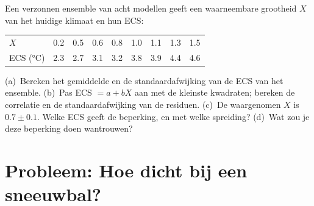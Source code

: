 \begin{exercise}[$\star\star\star$]\label{exo:b3:climate-models:12}
Een verzonnen ensemble van acht modellen geeft een waarneembare grootheid $X$ van het
huidige klimaat en hun ECS:
\begin{center}
\begin{tabular}{l*{8}{c}}
\hline
$X$ & 0.2 & 0.5 & 0.6 & 0.8 & 1.0 & 1.1 & 1.3 & 1.5\\
ECS (\unit{\celsius}) & 2.3 & 2.7 & 3.1 & 3.2 & 3.8 & 3.9 & 4.4 & 4.6\\
\hline
\end{tabular}
\end{center}
(a)~Bereken het gemiddelde en de standaardafwijking van de ECS van het
ensemble. (b)~Pas ECS $= a + bX$ aan met de kleinste kwadraten; bereken de correlatie
en de standaardafwijking van de residuen. (c)~De waargenomen $X$ is $0.7
\pm 0.1$. Welke ECS geeft de beperking, en met welke spreiding?
(d)~Wat zou je deze beperking doen wantrouwen?
\end{exercise}

\section{Probleem: Hoe dicht bij een sneeuwbal?}

